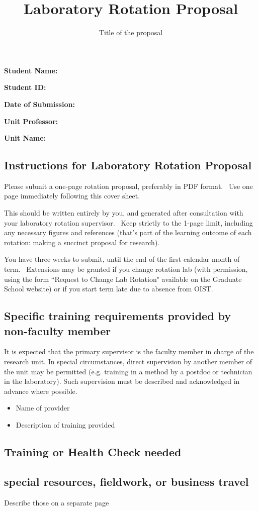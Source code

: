 \documentclass[fontsize=11pt, twocolumn]{scrartcl}	 %
\title{\vspace{-2.8cm}  \color{DarkRed} Laboratory Rotation Proposal}
\subtitle{Title of the proposal %
\vspace{-2cm} }
\date{} %
\begin{document}
\maketitle %
\thispagestyle{fancy} %

\textbf{Student Name:}  

\textbf{Student ID:} 

\textbf{Date of Submission:}

 \textbf{Unit Professor:} 

\textbf{Unit Name:} 	

\subsection*{Instructions for Laboratory Rotation Proposal}

Please submit a one-page rotation proposal, preferably in PDF format.  Use one page immediately following this cover sheet.

This should be written entirely by you, and generated after consultation with your laboratory rotation supervisor.  Keep strictly to the 1-page limit, including any necessary figures and references (that's part of the learning outcome of each rotation: making a succinct proposal for research).

You have three weeks to submit, until the end of the first calendar month of term.  Extensions may be granted if you change rotation lab (with permission, using the form ``Request to Change Lab Rotation" available on the Graduate School website) or if you start term late due to absence from OIST.

\vfill \break

\subsection*{Specific training requirements provided by non-faculty member}

It is expected that the primary supervisor is the faculty member in charge of the research unit. In special circumstances, direct supervision by another member of the unit may be permitted  (e.g. training in a method by a postdoc or technician in the laboratory).  Such supervision must be described and acknowledged in advance where possible.

\begin{itemize}
\item{Name of provider} 
\item{Description of training provided}
\end{itemize}

\subsection*{Training or Health Check needed}

\subsection*{special resources, fieldwork, or business travel}

Describe those on a separate page
\end{document}
